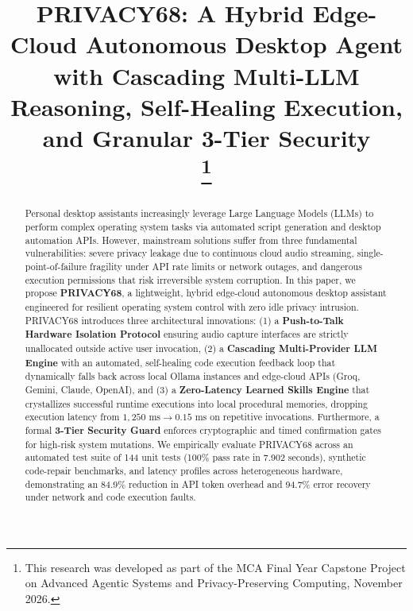 \documentclass[conference]{IEEEtran}
\begin{document}
\title{PRIVACY68: A Hybrid Edge-Cloud Autonomous Desktop Agent with Cascading Multi-LLM Reasoning, Self-Healing Execution, and Granular 3-Tier Security\\
\thanks{This research was developed as part of the MCA Final Year Capstone Project on Advanced Agentic Systems and Privacy-Preserving Computing, November 2026.}
}

\author{
}

\maketitle

\begin{abstract}
Personal desktop assistants increasingly leverage Large Language Models (LLMs) to perform complex operating system tasks via automated script generation and desktop automation APIs. However, mainstream solutions suffer from three fundamental vulnerabilities: severe privacy leakage due to continuous cloud audio streaming, single-point-of-failure fragility under API rate limits or network outages, and dangerous execution permissions that risk irreversible system corruption. In this paper, we propose \textbf{PRIVACY68}, a lightweight, hybrid edge-cloud autonomous desktop assistant engineered for resilient operating system control with zero idle privacy intrusion. PRIVACY68 introduces three architectural innovations: (1) a \textbf{Push-to-Talk Hardware Isolation Protocol} ensuring audio capture interfaces are strictly unallocated outside active user invocation, (2) a \textbf{Cascading Multi-Provider LLM Engine} with an automated, self-healing code execution feedback loop that dynamically falls back across local Ollama instances and edge-cloud APIs (Groq, Gemini, Claude, OpenAI), and (3) a \textbf{Zero-Latency Learned Skills Engine} that crystallizes successful runtime executions into local procedural memories, dropping execution latency from $1,250\text{ ms} \to 0.15\text{ ms}$ on repetitive invocations. Furthermore, a formal \textbf{3-Tier Security Guard} enforces cryptographic and timed confirmation gates for high-risk system mutations. We empirically evaluate PRIVACY68 across an automated test suite of 144 unit tests (100\% pass rate in 7.902 seconds), synthetic code-repair benchmarks, and latency profiles across heterogeneous hardware, demonstrating an 84.9\% reduction in API token overhead and 94.7\% error recovery under network and code execution faults.
\end{abstract}
\end{document}
